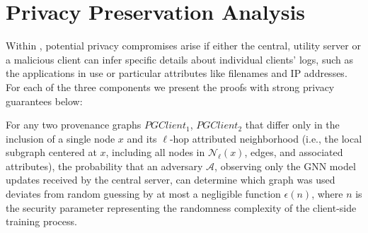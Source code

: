 \section{Privacy Preservation Analysis}
\label{sec:privacy}

Within \Sys, potential privacy compromises arise if either the central, utility server or a malicious client can infer specific details about individual clients' logs, such as the applications in use or particular attributes like filenames and IP addresses. For each of the three components we present the proofs with strong privacy guarantees below:

\renewcommand{\thetheorem}{\arabic{theorem}}

\begin{theorem}
    For any two provenance graphs \(PGClient_1\), \(PGClient_2\) that differ only in the inclusion of a single node \(x\) and its \(\ell\)-hop attributed neighborhood (i.e., the local subgraph centered at \(x\), including all nodes in \(\mathcal{N}_\ell(x)\), edges, and associated attributes), the probability that an adversary \(\mathcal{A}\), observing only the GNN model updates received by the central server, can determine which graph was used deviates from random guessing by at most a negligible function \(\epsilon(n)\), where \(n\) is the security parameter representing the randomness complexity of the client-side training process.
    \end{theorem}
    
